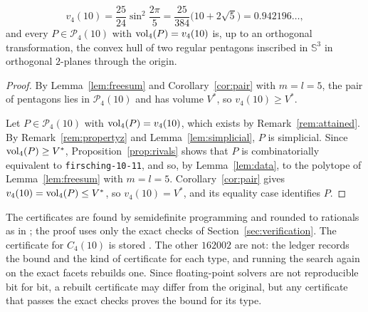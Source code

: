 \begin{theorem}
  \label{thm:main}
  \[
    v_{4}(10) = \frac{25}{24}\sin^{2}\frac{2\pi}{5}
      = \frac{25}{384}\bigl(10 + 2\sqrt{5}\bigr) = 0.942196\ldots,
  \]
  and every $P \in \mathcal{P}_{4}(10)$ with $\operatorname{vol}_{4}(P) = v_{4}(10)$ is, up to
  an orthogonal transformation, the convex hull of two regular pentagons
  inscribed in $\mathbb{S}^{3}$ in orthogonal $2$-planes through the origin.
\end{theorem}

\begin{proof}
  By Lemma~\ref{lem:freesum} and Corollary~\ref{cor:pair} with
  $m = l = 5$, the pair of pentagons lies in $\mathcal{P}_{4}(10)$ and has
  volume $V^{*}$, so $v_{4}(10) \geq V^{*}$.

  Let $P \in \mathcal{P}_{4}(10)$ with $\operatorname{vol}_{4}(P) = v_{4}(10)$, which exists
  by Remark~\ref{rem:attained}. By Remark~\ref{rem:propertyz} and
  Lemma~\ref{lem:simplicial}, $P$ is simplicial. Since
  $\operatorname{vol}_{4}(P) \geq V^{*}$, Proposition~\ref{prop:rivals} shows that $P$ is
  combinatorially equivalent to \texttt{firsching-10-11}, and so, by
  Lemma~\ref{lem:data}, to the polytope of Lemma~\ref{lem:freesum} with
  $m = l = 5$. Corollary~\ref{cor:pair} gives
  $v_{4}(10) = \operatorname{vol}_{4}(P) \leq V^{*}$, so $v_{4}(10) = V^{*}$, and its
  equality case identifies $P$.
\end{proof}

\begin{remark}
  \label{rem:computations}
  The certificates are found by semidefinite programming and rounded to
  rationals as in \cite[Section~3.4]{medgyes-maxvol-d4}; the proof uses only
  the exact checks of Section~\ref{sec:verification}. The certificate for
  $C_{4}(10)$ is stored . The other $162002$ are not: the
  ledger  records the bound and the kind of certificate for
  each type, and running the search again on the exact facets
   rebuilds one. Since floating-point solvers are not
  reproducible bit for bit, a rebuilt certificate may differ from the
  original, but any certificate that passes the exact checks proves the
  bound for its type.
\end{remark}
